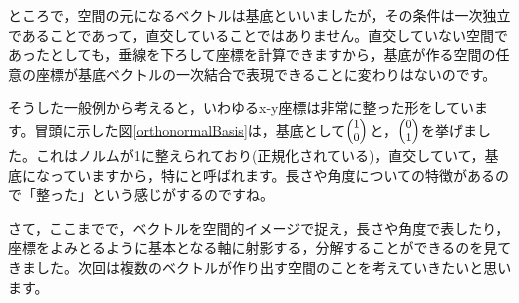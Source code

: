 \documentclass{ltjsbook}
\begin{document}
ところで，空間の元になるベクトルは基底といいましたが，その条件は一次独立であることであって，直交していることではありません。直交していない空間であったとしても，垂線を下ろして座標を計算できますから，基底が作る空間の任意の座標が基底ベクトルの一次結合で表現できることに変わりはないのです。

そうした一般例から考えると，いわゆるx-y座標は非常に整った形をしています。冒頭に示した図\ref{orthonormalBasis}は，基底として$\footnotesize\begin{pmatrix}1\\0\end{pmatrix}$と，$\footnotesize\begin{pmatrix}0 \\ 1\end{pmatrix}$を挙げました。これはノルムが1に整えられており(正規化されている)，直交していて，基底になっていますから，特にと呼ばれます。長さや角度についての特徴があるので「整った」という感じがするのですね。

\vspace{2cm}
さて，ここまでで，ベクトルを空間的イメージで捉え，長さや角度で表したり，座標をよみとるように基本となる軸に射影する，分解することができるのを見てきました。次回は複数のベクトルが作り出す空間のことを考えていきたいと思います。
\end{document}
